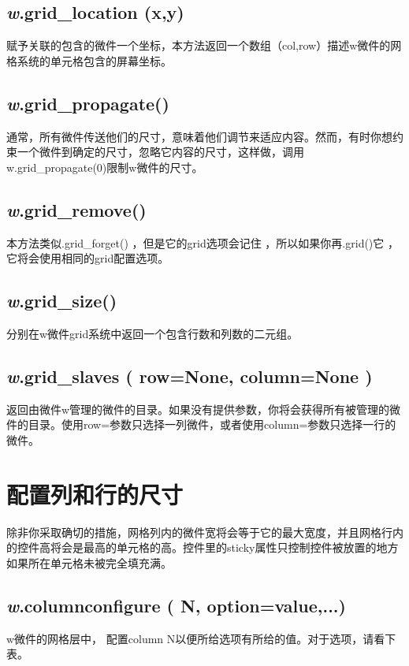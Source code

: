 \subsection*{\textsf{\textit{w}.grid\_location (x,y)}}
\par{赋予关联的包含的微件一个坐标，本方法返回一个数组（col,row）描述w微件的网格系统的单元格包含的屏幕坐标。}

\subsection*{\textsf{\textit{w}.grid\_propagate()}}
\par{通常，所有微件传送他们的尺寸，意味着他们调节来适应内容。然而，有时你想约束一个微件到确定的尺寸，忽略它内容的尺寸，这样做，调用w.grid\_propagate(0)限制w微件的尺寸。}

\subsection*{\textsf{\textit{w}.grid\_remove()}}
\par{本方法类似.grid\_forget() ，但是它的grid选项会记住 ，所以如果你再.grid()它 ，它将会使用相同的grid配置选项。}

\subsection*{\textsf{\textit{w}.grid\_size()}}
\par{分别在w微件grid系统中返回一个包含行数和列数的二元组。}

\subsection*{\textsf{\textit{w}.grid\_slaves ( row=None, column=None )}}
\par{返回由微件w管理的微件的目录。如果没有提供参数，你将会获得所有被管理的微件的目录。使用row=参数只选择一列微件，或者使用column=参数只选择一行的微件。}

\section{配置列和行的尺寸}
除非你采取确切的措施，网格列内的微件宽将会等于它的最大宽度，并且网格行内的控件高将会是最高的单元格的高。控件里的sticky属性只控制控件被放置的地方如果所在单元格未被完全填充满。

\subsection*{\textsf{\textit{w}.columnconfigure ( N, option=value,...)}}
\par{w微件的网格层中， 配置column N以便所给选项有所给的值。对于选项，请看下表。}

